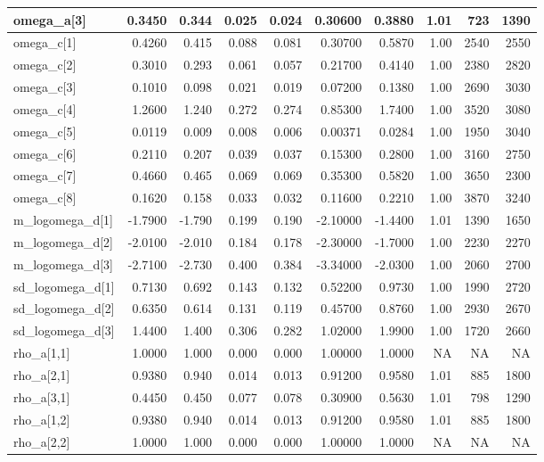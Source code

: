 \documentclass[
]{article}
\begin{document}
\begin{longtable*}[t]{l|r|r|r|r|r|r|r|r|r}
\hline
omega\_a[3] & 0.3450 & 0.344 & 0.025 & 0.024 & 0.30600 & 0.3880 & 1.01 & 723 & 1390\\
\hline
omega\_c[1] & 0.4260 & 0.415 & 0.088 & 0.081 & 0.30700 & 0.5870 & 1.00 & 2540 & 2550\\
\hline
omega\_c[2] & 0.3010 & 0.293 & 0.061 & 0.057 & 0.21700 & 0.4140 & 1.00 & 2380 & 2820\\
\hline
omega\_c[3] & 0.1010 & 0.098 & 0.021 & 0.019 & 0.07200 & 0.1380 & 1.00 & 2690 & 3030\\
\hline
omega\_c[4] & 1.2600 & 1.240 & 0.272 & 0.274 & 0.85300 & 1.7400 & 1.00 & 3520 & 3080\\
\hline
omega\_c[5] & 0.0119 & 0.009 & 0.008 & 0.006 & 0.00371 & 0.0284 & 1.00 & 1950 & 3040\\
\hline
omega\_c[6] & 0.2110 & 0.207 & 0.039 & 0.037 & 0.15300 & 0.2800 & 1.00 & 3160 & 2750\\
\hline
omega\_c[7] & 0.4660 & 0.465 & 0.069 & 0.069 & 0.35300 & 0.5820 & 1.00 & 3650 & 2300\\
\hline
omega\_c[8] & 0.1620 & 0.158 & 0.033 & 0.032 & 0.11600 & 0.2210 & 1.00 & 3870 & 3240\\
\hline
m\_logomega\_d[1] & -1.7900 & -1.790 & 0.199 & 0.190 & -2.10000 & -1.4400 & 1.01 & 1390 & 1650\\
\hline
m\_logomega\_d[2] & -2.0100 & -2.010 & 0.184 & 0.178 & -2.30000 & -1.7000 & 1.00 & 2230 & 2270\\
\hline
m\_logomega\_d[3] & -2.7100 & -2.730 & 0.400 & 0.384 & -3.34000 & -2.0300 & 1.00 & 2060 & 2700\\
\hline
sd\_logomega\_d[1] & 0.7130 & 0.692 & 0.143 & 0.132 & 0.52200 & 0.9730 & 1.00 & 1990 & 2720\\
\hline
sd\_logomega\_d[2] & 0.6350 & 0.614 & 0.131 & 0.119 & 0.45700 & 0.8760 & 1.00 & 2930 & 2670\\
\hline
sd\_logomega\_d[3] & 1.4400 & 1.400 & 0.306 & 0.282 & 1.02000 & 1.9900 & 1.00 & 1720 & 2660\\
\hline
rho\_a[1,1] & 1.0000 & 1.000 & 0.000 & 0.000 & 1.00000 & 1.0000 & NA & NA & NA\\
\hline
rho\_a[2,1] & 0.9380 & 0.940 & 0.014 & 0.013 & 0.91200 & 0.9580 & 1.01 & 885 & 1800\\
\hline
rho\_a[3,1] & 0.4450 & 0.450 & 0.077 & 0.078 & 0.30900 & 0.5630 & 1.01 & 798 & 1290\\
\hline
rho\_a[1,2] & 0.9380 & 0.940 & 0.014 & 0.013 & 0.91200 & 0.9580 & 1.01 & 885 & 1800\\
\hline
rho\_a[2,2] & 1.0000 & 1.000 & 0.000 & 0.000 & 1.00000 & 1.0000 & NA & NA & NA\\

\end{longtable*}
\end{document}
